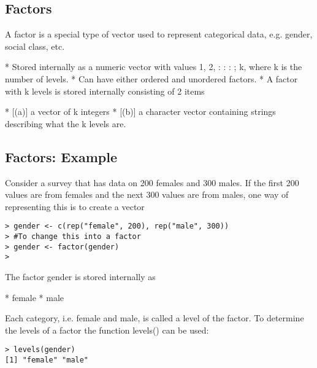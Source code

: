 
\subsection*{Factors}
A factor is a special type of vector used to represent categorical
data, e.g. gender, social class, etc.
\begin{itemize}
*  Stored internally as a numeric vector with values 1, 2, : : : ; k,
where k is the number of levels.
*  Can have either ordered and unordered factors.
*  A factor with k levels is stored internally consisting of 2 items
\begin{itemize}
* [(a)] a vector of k integers
* [(b)] a character vector containing strings describing what the k
levels are.
\end{itemize}
\end{itemize}



\subsection{Factors: Example}
Consider a survey that has data on 200 females and 300 males. If
the first 200 values are from females and the next 300 values are
from males, one way of representing this is to create a vector
\begin{framed}
\begin{verbatim}
> gender <- c(rep("female", 200), rep("male", 300))
> #To change this into a factor
> gender <- factor(gender)
>
\end{verbatim}
\end{framed}The factor gender is stored internally as
\begin{enumerate}
*  female
*  male
\end{enumerate}

Each category, i.e. female and male, is called a level of the factor.
To determine the levels of a factor the function levels() can be
used:
\begin{framed}
\begin{verbatim}
> levels(gender)
[1] "female" "male"

\end{verbatim}
\end{framed}

